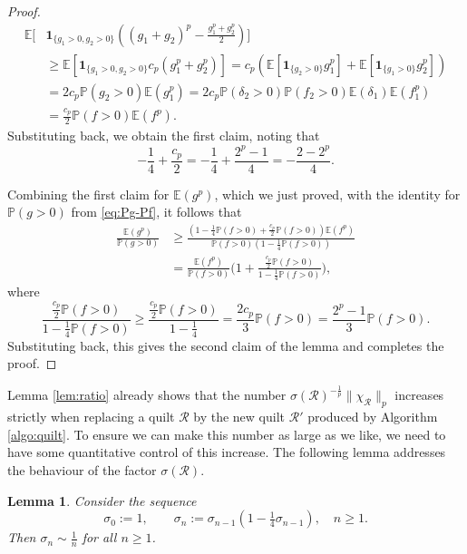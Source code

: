 \documentclass[11pt, reqno]{amsart}
\newtheorem{lemma}[theorem]{Lemma}
\theoremstyle{definition}
\theoremstyle{remark}
\numberwithin{equation}{section}
\newcommand{\E}{\mathbb E}
\renewcommand{\P}{\mathbb P}
\newcommand{\one}{\mathbf{1}}
\newcommand{\Norm}[2]{\|#1\|_{#2}}
\begin{document}
\begin{proof}
\begin{equation*}
\begin{split}
  \E[ &\one_{\{g_1>0,g_2>0\}} ((g_1+g_2)^p-\frac{g_1^p+g_2^p}{2})] \\
  &\geq \E[\one_{\{g_1>0,g_2>0\}} c_p (g_1^p+g_2^p)]
  =c_p (\E[\one_{\{g_2>0\}}g_1^p]+\E[\one_{\{g_1>0\}}g_2^p]) \\
  &=2c_p \P(g_2>0)\E(g_1^p)
  =2c_p\P(\delta_2>0)\P(f_2>0)\E(\delta_1)\E(f_1^p) \\
  &=\frac{c_p}{2}\P(f>0)\E(f^p).
\end{split}
\end{equation*}
Substituting back, we obtain the first claim, noting that
\begin{equation*}
  -\frac14+\frac{c_p}{2}=-\frac14+\frac{2^p-1}{4}=-\frac{2-2^p}{4}.
\end{equation*}

Combining the first claim for $\E(g^p)$, which we just proved, with the identity for $\P(g>0)$ from \eqref{eq:Pg-Pf}, it follows that
\begin{equation*}
\begin{split}
  \frac{\E(g^p)}{\P(g>0)}
  &\geq \frac{(1-\frac14\P(f>0)+\frac{c_p}{2}\P(f>0))\E(f^p)}{\P(f>0)(1-\frac14\P(f>0))} \\
  &=\frac{\E(f^p)}{\P(f>0)}\Big(1+\frac{\frac{c_p}{2}\P(f>0)}{1-\frac14\P(f>0)}\Big),
\end{split}
\end{equation*}
where
\begin{equation*}
  \frac{\frac{c_p}{2}\P(f>0)}{1-\frac14\P(f>0)}
  \geq\frac{\frac{c_p}{2}\P(f>0)}{1-\frac14}
  =\frac{2c_p}{3}\P(f>0)
  =\frac{2^p-1}{3}\P(f>0).
\end{equation*}
Substituting back, this gives the second claim of the lemma and completes the proof.
\end{proof}

Lemma \ref{lem:ratio} already shows that the number $\sigma(\mathscr R)^{-\frac1p}\Norm{\chi_{\mathscr R}}{p}$ increases strictly when replacing a quilt $\mathscr R$ by the new quilt $\mathscr R'$ produced by Algorithm \ref{algo:quilt}. To ensure we can make this number as large as we like, we need to have some quantitative control of this increase. The following lemma addresses the behaviour of the factor $\sigma(\mathscr R)$.

\begin{lemma}\label{lem:sigma-n}
Consider the sequence
\begin{equation*}
  \sigma_0:=1,\qquad\sigma_n:=\sigma_{n-1}(1-\tfrac14\sigma_{n-1}),\quad n\geq 1.
\end{equation*}
Then $\sigma_n\sim\frac{1}{n}$ for all $n\geq 1$.
\end{lemma}
\end{document}
